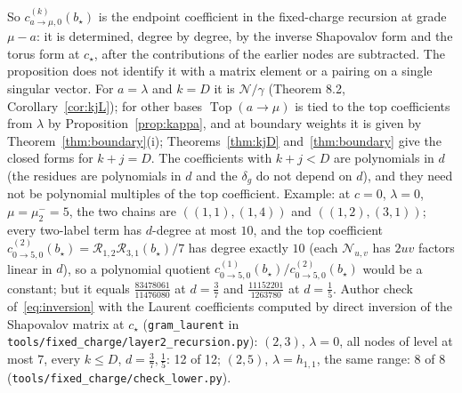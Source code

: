 \documentclass[11pt]{article}
\theoremstyle{remark}
\begin{document}
So $c^{(k)}_{a\to\mu,0}(b_\star)$ is the endpoint coefficient in the fixed-charge
recursion at grade $\mu-a$: it is determined, degree by degree, by the inverse
Shapovalov form and the torus form at $c_\star$, after the contributions of the
earlier nodes are subtracted.  The proposition does not identify it with a
matrix element or a pairing on a single singular vector.  For $a=\lambda$ and
$k=D$ it is $\mathcal N/\gamma$ (Theorem 8.2, Corollary~\ref{cor:kjL}); for
other bases $\operatorname{Top}(a\to\mu)$ is tied to the top coefficients from
$\lambda$ by Proposition~\ref{prop:kappa}, and at boundary weights it is given by
Theorem~\ref{thm:boundary}(i); Theorems~\ref{thm:kjD}
and~\ref{thm:boundary} give the closed forms for $k+j=D$.  The coefficients with
$k+j<D$ are polynomials in $d$ (the residues are polynomials in $d$ and the
$\delta_g$ do not depend on $d$), and they need not be polynomial multiples of
the top coefficient.  Example: at $c=0$, $\lambda=0$, $\mu=\mu^-_2=5$, the two
chains are $((1,1),(1,4))$ and $((1,2),(3,1))$; every two-label term has
$d$-degree at most $10$, and the top coefficient
$c^{(2)}_{0\to5,0}(b_\star)=\mathcal R_{1,2}\mathcal R_{3,1}(b_\star)/7$ has degree
exactly $10$ (each $\mathcal N_{u,v}$ has $2uv$ factors linear in $d$), so a
polynomial quotient $c^{(1)}_{0\to5,0}(b_\star)/c^{(2)}_{0\to5,0}(b_\star)$
would be a constant; but it equals $\frac{83478061}{11476080}$ at $d=\frac37$ and
$\frac{11152201}{1263780}$ at $d=\frac15$.  Author check of~\eqref{eq:inversion} with the Laurent coefficients
computed by direct inversion of the Shapovalov matrix at $c_\star$
(\texttt{gram\_laurent} in \texttt{tools/fixed\_charge/layer2\_recursion.py}): $(2,3)$, $\lambda=0$,
all nodes of level at most $7$, every $k\le D$, $d=\frac37,\frac15$: 12 of 12;
$(2,5)$, $\lambda=h_{1,1}$, the same range: 8 of 8 (\texttt{tools/fixed\_charge/check\_lower.py}).
\end{document}
